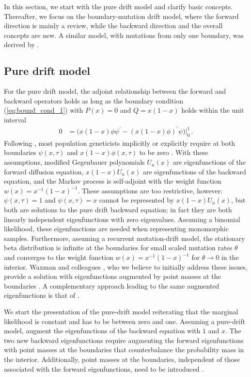 \documentclass[preprint]{elsarticle}
\begin{document}
In this section, we start with the pure drift model and clarify basic concepts. Thereafter, we focus on the boundary-mutation drift model, where the forward direction is mainly a review, while the backward direction and the overall concepts are new. A similar model, with mutations from only one boundary, was derived by \citet{Evan07}.

\subsection{Pure drift model}\label{section:pure_drift}

For the pure drift model, the adjoint relationship between the forward and backward operators holds as long as the boundary condition (\ref{eq:bound_cond_1}) with $P(x)=0$ and $Q=x(1-x)$ holds within the unit interval 
\begin{equation}\label{eq:bound_pure_drift}
\begin{split}
    0&=\big(x(1-x)\phi\psi^{'}-(x(1-x)\phi)^{'}\psi\big)\big|_0^1\,.    
\end{split}
\end{equation}
Following \citet{Kimu55}, most population geneticists implicitly or explicitly require at both boundaries $\psi(x,\tau)$ and $x(1-x)\phi(x,\tau)$ to be zero \citep[see also][]{Ewen04,Song12}. With these assumptions, modified Gegenbauer polynomials $U_n(x)$ are eigenfunctions of the forward diffusion equation, $x(1-x)U_n(x)$ are eigenfunctions of the backward equation, and the Markov process is self-adjoint with the weight function $w(x)=x^{-1}(1-x)^{-1}$. These assumptions are too restrictive, however: $\psi(x,\tau)=1$ and $\psi(x,\tau)=x$ cannot be represented by $x(1-x)U_n(x)$, but both are solutions to the pure drift backward equation; in fact they are both linearly independent eigenfunctions with zero eigenvalues. Assuming a binomial likelihood, these eigenfunctions are needed when representing monomorphic samples. Furthermore, assuming a recurrent mutation-drift model, the stationary beta distribution is infinite at the boundaries for small scaled mutation rates $\theta$ and converges to the weight function $w(x)=x^{-1}(1-x)^{-1}$ for $\theta\to0$ in the interior. Waxman and colleagues \citep{McKa07,Waxm11}, who we believe to initially  address these issues, provide a solution with eigenfunctions augmented by point masses at the boundaries \citep{McKa07,Waxm11}. A complementary approach leading to the same augmented eigenfunctions is that of \citet{Tran14b}.

We start the presentation of the pure-drift model reiterating that the marginal likelihood is constant and has to be between zero and one. Assuming a pure-drift model, \citet{Tran14b} augment the eigenfunctions of the backward equation with $1$ and $x$. The two new backward eigenfunctions require augmenting the forward eigenfunctions with point masses at the boundaries that counterbalance the probability mass in the interior. Additionally, point masses at the boundaries, independent of those associated with the forward eigenfunctions, need to be introduced \citep{Tran14b}. 
\end{document}
